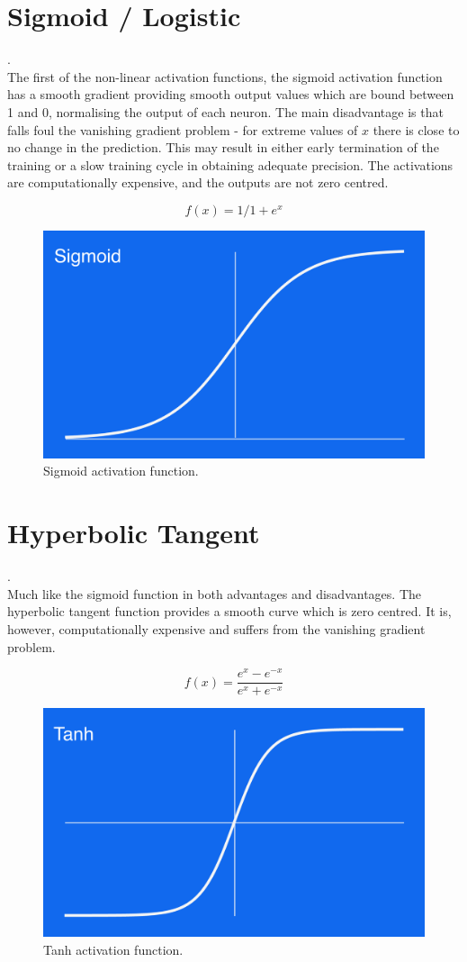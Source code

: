\section{Sigmoid / Logistic}.\\

The first of the non-linear activation functions, the sigmoid activation function has a smooth gradient providing smooth output values which are bound between 1 and 0, normalising the output of each neuron. The main disadvantage is that falls foul the vanishing gradient problem - for extreme values of $x$ there is close to no change in the prediction. This may result in either early termination of the training or a slow training cycle in obtaining adequate precision. The activations are computationally expensive, and the outputs are not zero centred.

\begin{equation}
    f(x) = 1/1+e^x
\end{equation}
\begin{figure}[H]
\centering
\includegraphics[width=.265\textwidth]{sigmoid.png}
\caption{Sigmoid activation function.}
\end{figure}


\section{Hyperbolic Tangent}.\label{apx:tanh}\\
Much like the sigmoid function in both advantages and disadvantages. The hyperbolic tangent function provides a smooth curve which is zero centred. It is, however, computationally expensive and suffers from the vanishing gradient problem.

\begin{equation}
    f(x) = \frac {e^x - e^{-x}} {e^x + e^{-x}}
\end{equation}
\begin{figure}[H]
\centering
\includegraphics[width=.265\textwidth]{tanh.png}
\caption{Tanh activation function.}
\end{figure}


